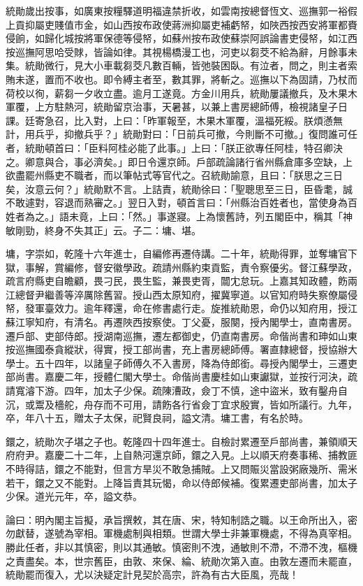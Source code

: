 \begin{pinyinscope}
統勛歲出按事，如廣東按糧驛道明福違禁折收，如雲南按總督恆文、巡撫郭一裕假上貢抑屬吏賤值巿金，如山西按布政使蔣洲抑屬吏補虧帑，如陜西按西安將軍都賚侵餉，如歸化城按將軍保德等侵帑，如蘇州按布政使蘇崇阿誤論書吏侵帑，如江西按巡撫阿思哈受賕，皆論如律。其視楊橋漫工也，河吏以芻茭不給為辭，月餘事未集。統勛微行，見大小車載芻茭凡數百輛，皆弛裝困臥。有泣者，問之，則主者索賄未遂，置而不收也。即令縛主者至，數其罪，將斬之。巡撫以下為固請，乃杖而荷校以徇，薪芻一夕收立盡。逾月工遂竟。方金川用兵，統勛屢議撤兵，及木果木軍覆，上方駐熱河，統勛留京治事，天暑甚，以兼上書房總師傅，檢視諸皇子日課。廷寄急召，比入對，上曰：「昨軍報至，木果木軍覆，溫福死綏。朕煩懣無計，用兵乎，抑撤兵乎？」統勛對曰：「日前兵可撤，今則斷不可撤。」復問誰可任者，統勛頓首曰：「臣料阿桂必能了此事。」上曰：「朕正欲專任阿桂，特召卿決之。卿意與合，事必濟矣。」即日令還京師。戶部疏論諸行省州縣倉庫多空缺，上欲盡罷州縣吏不職者，而以筆帖式等官代之。召統勛諭意，且曰：「朕思之三日矣，汝意云何？」統勛默不言。上詰責，統勛徐曰：「聖聰思至三日，臣昏耄，誠不敢遽對，容退而熟審之。」翌日入對，頓首言曰：「州縣治百姓者也，當使身為百姓者為之。」語未竟，上曰：「然。」事遂寢。上為懷舊詩，列五閣臣中，稱其「神敏剛勁，終身不失其正」云。子二：墉、堪。

墉，字崇如，乾隆十六年進士，自編修再遷侍講。二十年，統勛得罪，並奪墉官下獄，事解，賞編修，督安徽學政。疏請州縣約束貢監，責令察優劣。督江蘇學政，疏言府縣吏自瞻顧，畏刁民，畏生監，兼畏吏胥，闒冘怠玩。上嘉其知政體，飭兩江總督尹繼善等淬厲除舊習。授山西太原知府，擢冀寧道。以官知府時失察僚屬侵帑，發軍臺效力。逾年釋還，命在修書處行走。旋推統勛恩，命仍以知府用，授江蘇江寧知府，有清名。再遷陜西按察使。丁父憂，服闋，授內閣學士，直南書房。遷戶部、吏部侍郎。授湖南巡撫，遷左都御史，仍直南書房。命偕尚書和珅如山東按巡撫國泰貪縱狀，得實，授工部尚書，充上書房總師傅。署直隸總督，授協辦大學士。五十四年，以諸皇子師傅久不入書房，降為侍郎銜。尋授內閣學士，三遷吏部尚書。嘉慶二年，授體仁閣大學士。命偕尚書慶桂如山東讞獄，並按行河決，疏請寬濬下游。四年，加太子少保。疏陳漕政，僉丁不慎，途中盜米，致有鑿舟自沉，或鬻及檣舵，舟存而不可用，請飭各行省僉丁宜求殷實，皆如所議行。九年，卒，年八十五，贈太子太保，祀賢良祠，謚文清。墉工書，有名於時。

鐶之，統勛次子堪之子也。乾隆四十四年進士。自檢討累遷至戶部尚書，兼領順天府府尹。嘉慶二十二年，上自熱河還京師，鐶之入見。上以順天府奏事稀、捕教匪不時得詰，鐶之不能對，但言方旱災不敢急捕賊。上又問賑災當設粥廠幾所、需米若干，鐶之又不能對。上降旨責其玩愒，命以侍郎候補。復累遷吏部尚書，加太子少保。道光元年，卒，謚文恭。

論曰：明內閣主旨擬，承旨撰敕，其在唐、宋，特知制誥之職。以王命所出入，密勿獻替，遂號為宰相。軍機處制與相類。世謂大學士非兼軍機處，不得為真宰相。勝此任者，非以其慎密，則以其通敏。慎密則不洩，通敏則不滯，不滯不洩，樞機之責盡矣。本，世宗舊臣，由敦、來保、綸、統勛次第入直。由敦左遷而未罷直，統勛罷而復入，尤以決疑定計見契於高宗，許為有古大臣風，亮哉！


\end{pinyinscope}